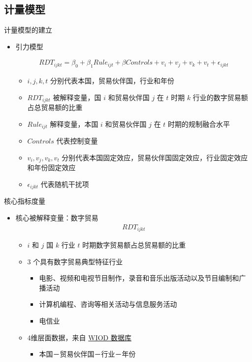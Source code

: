\documentclass{beamer}
\begin{document}
\subsection{计量模型}
\begin{frame}{计量模型的建立}
    \begin{itemize}
        \item 引力模型
        \begin{footnotesize}
            \begin{gather*}
                RDT_{ijkt} = \beta_0 + \beta_1 Rule_{ijt} + \beta Controls + v_i + v_j + v_k + v_t + \epsilon_{ijkt} \tag{12}
            \end{gather*}
        \end{footnotesize}
        \begin{itemize}
            \item $i, j, k, t$ 分别代表本国，贸易伙伴国，行业和年份
            \item $RDT_{ijkt}$ 被解释变量，国 $i$ 和贸易伙伴国 $j$ 在 $t$ 时期 $k$ 行业的数字贸易额占总贸易额的比重
            \item $Rule_{ijt}$ 解释变量，本国 $i$ 和贸易伙伴国 $j$ 在 $t$ 时期的规制融合水平
            \item $Controls$ 代表控制变量
            \item $v_i, v_j, v_k, v_t$ 分别代表本国固定效应，贸易伙伴国固定效应，行业固定效应和年份固定效应 
            \item $\epsilon_{ijkt}$ 代表随机干扰项
        \end{itemize}
    \end{itemize}
\end{frame}

\begin{frame}{核心指标度量}
    \begin{itemize}
        \item \large 核心被解释变量：数字贸易
        \begin{align*}
            RDT_{ijkt}
        \end{align*}
        \begin{itemize}
            \item $i$ 和 $j$ 国 $k$ 行业 $t$ 时期数字贸易额占总贸易额的比重
            \item 3 个具有数字贸易典型特征行业
            \begin{itemize}
                \item 电影、视频和电视节目制作，录音和音乐出版活动以及节目编制和广播活动
                \item 计算机编程、咨询等相关活动与信息服务活动
                \item 电信业
            \end{itemize}
            \item 4维层面数据，来自 \underline{WIOD 数据库}
            \begin{itemize}
                \item 本国－贸易伙伴国－行业－年份
            \end{itemize}
        \end{itemize}
    \end{itemize}
\end{frame}
\end{document}
